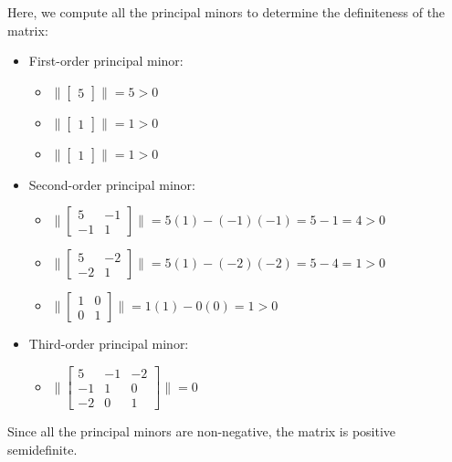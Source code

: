 \documentclass{article}
\begin{document}
\begin{itemize}
Here, we compute all the principal minors to determine the definiteness of the matrix:
\begin{itemize}
\item First-order principal minor:
\begin{itemize}
   \item $\bigl\|\begin{bmatrix} 5 \end{bmatrix}\bigr\| = 5 > 0$
   \item $\bigl\|\begin{bmatrix} 1 \end{bmatrix}\bigr\| = 1 > 0$
   \item $\bigl\|\begin{bmatrix} 1 \end{bmatrix}\bigr\| = 1 > 0$
\end{itemize}
\item Second-order principal minor:
\begin{itemize}
   \item $\bigl\|\begin{bmatrix} 5 & -1 \\ -1 & 1 \end{bmatrix}\bigr\| = 5(1) - (-1)(-1) = 5 - 1 = 4 > 0$
   \item $\bigl\|\begin{bmatrix} 5 & -2 \\ -2 & 1 \end{bmatrix}\bigr\| = 5(1) - (-2)(-2) = 5 - 4 = 1 > 0$
   \item $\bigl\|\begin{bmatrix} 1 & 0 \\ 0 & 1 \end{bmatrix}\bigr\| = 1(1) - 0(0) = 1 > 0$
\end{itemize}
\item Third-order principal minor:
\begin{itemize}
   \item $\bigl\|\begin{bmatrix} 5 & -1 & -2 \\ -1 & 1 & 0 \\ -2 & 0 & 1 \end{bmatrix}\bigr\| = 0$
\end{itemize}
\end{itemize}
\end{itemize}

Since all the principal minors are non-negative, the matrix is positive semidefinite.
\end{document}
